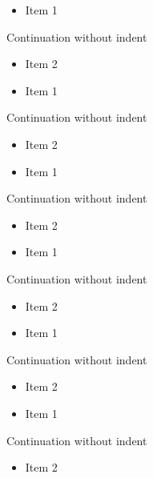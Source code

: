 \begin{itemize}
\item Item 1
\end{itemize}
Continuation without indent
\begin{itemize}
\item Item 2
\end{itemize}
\begin{itemize}
\item Item 1
\end{itemize}
Continuation without indent
\begin{itemize}
\item Item 2
\end{itemize}
\begin{itemize}
\item Item 1
\end{itemize}
Continuation without indent
\begin{itemize}
\item Item 2
\end{itemize}
\begin{frame}[t]
\begin{itemize}
\item Item 1
\end{itemize}
Continuation without indent
\begin{itemize}
\item Item 2
\end{itemize}
\end{frame}

\begin{frame}[t]
\begin{itemize}
\item Item 1
\end{itemize}
Continuation without indent
\begin{itemize}
\item Item 2
\end{itemize}
\end{frame}

\begin{frame}[t]
\begin{itemize}
\item Item 1
\end{itemize}
Continuation without indent
\begin{itemize}
\item Item 2
\end{itemize}
\end{frame}

